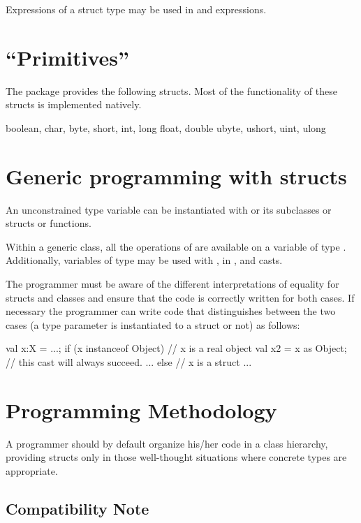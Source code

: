 Expressions of a struct type may be used in  and
 expressions.

\section{``Primitives''}

The package  provides the following structs. Most of
the functionality of these structs is implemented natively.

\begin{xten}
boolean, char, 
byte, short, int, long
float, double
ubyte, ushort, uint, ulong
\end{xten}
 
\section{Generic programming with structs}

An unconstrained type variable  can be instantiated with  or
its subclasses or structs or functions.

Within a generic class, all the operations of  are available
on a variable of type . Additionally, variables of type  may
be used with \Xcd{==, !=}, in , and casts.

The programmer must be aware of the different interpretations of
equality for structs and classes and ensure that the code is correctly
written for both cases. If necessary the programmer can write code
that distinguishes between the two cases (a type parameter  is
instantiated to a struct or not) as follows:

\begin{xten}
val x:X = ...;
if (x instanceof Object) { // x is a real object
   val x2 = x as Object; // this cast will always succeed.
   ...
} else { // x is a struct
   ...
}
\end{xten}
 
  
\section{Programming Methodology}

 A programmer should by default organize his/her code in a class
 hierarchy, providing structs only in those well-thought situations
 where concrete types are appropriate.

\subsection{Compatibility Note}

